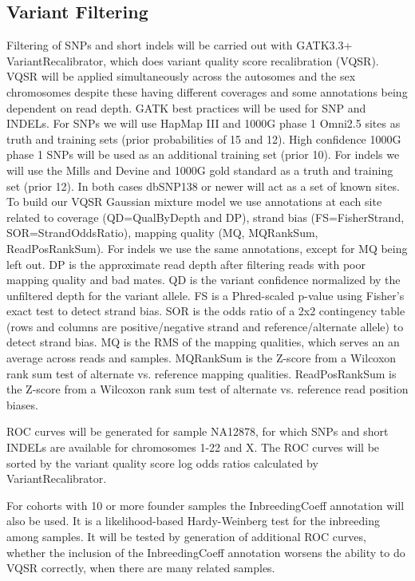 \subsection{Variant Filtering}
Filtering of SNPs and short indels will be carried out with GATK3.3+ VariantRecalibrator, which does variant quality score recalibration (VQSR). VQSR will be applied simultaneously across the autosomes and the sex chromosomes despite these having different coverages and some annotations being dependent on read depth. GATK best practices will be used for SNP and INDELs.
For SNPs we will use HapMap III and 1000G phase 1 Omni2.5 sites as truth and training sets (prior probabilities of 15 and 12). High confidence 1000G phase 1 SNPs will be used as an additional training set (prior 10). For indels we will use the Mills and Devine and 1000G gold standard as a truth and training set (prior 12). In both cases dbSNP138 or newer will act as a set of known sites.
To build our VQSR Gaussian mixture model we use annotations at each site related to coverage (QD=QualByDepth and DP), strand bias (FS=FisherStrand, SOR=StrandOddsRatio), mapping quality (MQ, MQRankSum, ReadPosRankSum). For indels we use the same annotations, except for MQ being left out.
DP is the approximate read depth after filtering reads with poor mapping quality and bad mates. QD is the variant confidence normalized by the unfiltered depth for the variant allele. FS is a Phred-scaled p-value using Fisher's exact test to detect strand bias. SOR is the odds ratio of a 2x2 contingency table (rows and columns are positive/negative strand and reference/alternate allele) to detect strand bias. MQ is the RMS of the mapping qualities, which serves an an average across reads and samples. MQRankSum is the Z-score from a Wilcoxon rank sum test of alternate vs. reference mapping qualities. ReadPosRankSum is the Z-score from a Wilcoxon rank sum test of alternate vs. reference read position biases.

ROC curves will be generated for sample NA12878, for which SNPs and short INDELs are available for chromosomes 1-22 and X. The ROC curves will be sorted by the variant quality score log odds ratios calculated by VariantRecalibrator.

For cohorts with 10 or more founder samples the InbreedingCoeff annotation will also be used. It is a likelihood-based Hardy-Weinberg test for the inbreeding among samples. It will be tested by generation of additional ROC curves, whether the inclusion of the InbreedingCoeff annotation worsens the ability to do VQSR correctly, when there are many related samples.

